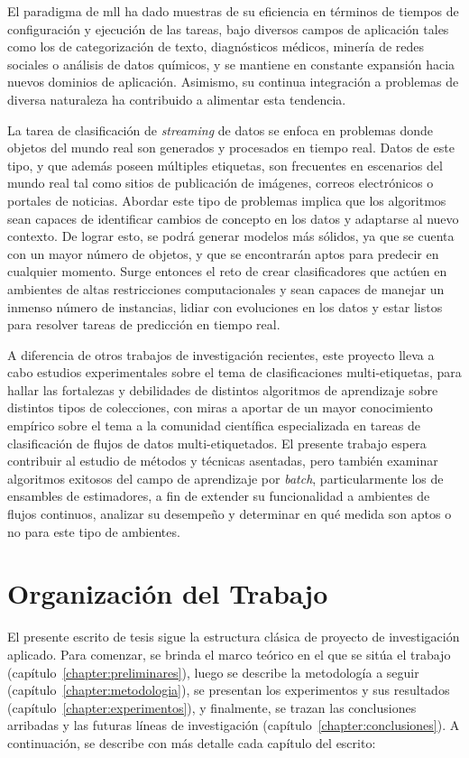 El paradigma de \acrshort{mll} ha dado muestras de su eficiencia en términos de
tiempos de configuración y ejecución de las tareas, bajo diversos campos de
aplicación tales como los de categorización de texto, diagnósticos médicos,
minería de redes sociales o análisis de datos químicos, y se mantiene en
constante expansión hacia nuevos dominios de aplicación. Asimismo, su continua
integración a problemas de diversa naturaleza ha contribuido a alimentar esta
tendencia.

La tarea de clasificación de \textit{streaming} de datos se enfoca en problemas
donde objetos del mundo real son generados y procesados en tiempo real. Datos de
este tipo, y que además poseen múltiples etiquetas, son frecuentes en escenarios
del mundo real tal como sitios de publicación de imágenes, correos electrónicos
o portales de noticias. Abordar este tipo de problemas implica que los
algoritmos sean capaces de identificar cambios de concepto en los datos y
adaptarse al nuevo contexto. De lograr esto, se podrá generar modelos más
sólidos, ya que se cuenta con un mayor número de objetos, y que se encontrarán
aptos para predecir en cualquier momento. Surge entonces el reto de crear
clasificadores que actúen en ambientes de altas restricciones computacionales y
sean capaces de manejar un inmenso número de instancias, lidiar con evoluciones
en los datos y estar listos para resolver tareas de predicción en tiempo real.

A diferencia de otros trabajos de investigación recientes, este proyecto lleva a
cabo estudios experimentales sobre el tema de clasificaciones multi-etiquetas,
para hallar las fortalezas y debilidades de distintos algoritmos de aprendizaje
sobre distintos tipos de colecciones, con miras a aportar de un mayor
conocimiento empírico sobre el tema a la comunidad científica especializada en
tareas de clasificación de flujos de datos multi-etiquetados. El presente
trabajo espera contribuir al estudio de métodos y técnicas asentadas, pero
también examinar algoritmos exitosos del campo de aprendizaje por
\textit{batch}, particularmente los de ensambles de estimadores, a fin de
extender su funcionalidad a ambientes de flujos continuos, analizar su desempeño
y determinar en qué medida son aptos o no para este tipo de ambientes.


\section{Organización del Trabajo}

El presente escrito de tesis sigue la estructura clásica de proyecto de
investigación aplicado. Para comenzar, se brinda el marco teórico en el que se
sitúa el trabajo (capítulo~\ref{chapter:preliminares}), luego se describe la
metodología a seguir (capítulo~\ref{chapter:metodologia}), se presentan los
experimentos y sus resultados (capítulo~\ref{chapter:experimentos}), y
finalmente, se trazan las conclusiones arribadas y las futuras líneas de
investigación (capítulo~\ref{chapter:conclusiones}). A continuación, se describe
con más detalle cada capítulo del escrito:


